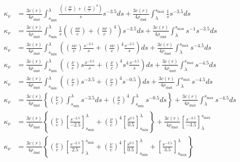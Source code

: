 \documentclass[12pt]{article}
\begin{document}
\begin{equation*}
\begin{split}
\kappa_\nu &= \frac{3c(r)}{4\rho_\mathrm{dust}} \int_{s_\mathrm{min}}^\lambda \frac{\left(\left(\frac{s\nu}{c}\right) + \left(\frac{s\nu}{c}\right)^4\right)}{s} s^{-3.5}ds + \frac{3c(r)}{4\rho_\mathrm{dust}} \int_\lambda^{s_\mathrm{max}} \frac{1}{s}s^{-3.5}ds \\
\kappa_\nu &= \frac{3c(r)}{4\rho_\mathrm{dust}} \int_{s_\mathrm{min}}^\lambda \frac{1}{s}\left(\left(\frac{s\nu}{c}\right) + \left(\frac{s\nu}{c}\right)^4\right) s^{-3.5}ds + \frac{3c(r)}{4\rho_\mathrm{dust}} \int_\lambda^{s_\mathrm{max}} s^{-1}s^{-3.5}ds \\
\kappa_\nu &= \frac{3c(r)}{4\rho_\mathrm{dust}} \int_{s_\mathrm{min}}^\lambda \left(\left(\frac{s\nu}{c}\right)\frac{s^{-3.5}}{s} + \left(\frac{s\nu}{c}\right)^4\frac{s^{-3.5}}{s}\right)ds + \frac{3c(r)}{4\rho_\mathrm{dust}} \int_\lambda^{s_\mathrm{max}} s^{-4.5}ds \\
\kappa_\nu &= \frac{3c(r)}{4\rho_\mathrm{dust}} \int_{s_\mathrm{min}}^\lambda \left(\left(\frac{\nu}{c}\right)s\frac{s^{-3.5}}{s} + \left(\frac{\nu}{c}\right)^4s^4\frac{s^{-3.5}}{s}\right)ds + \frac{3c(r)}{4\rho_\mathrm{dust}} \int_\lambda^{s_\mathrm{max}} s^{-4.5}ds \\
\kappa_\nu &= \frac{3c(r)}{4\rho_\mathrm{dust}} \int_{s_\mathrm{min}}^\lambda \left(\left(\frac{\nu}{c}\right)s^{-3.5} + \left(\frac{\nu}{c}\right)^4s^{-0.5}\right)ds + \frac{3c(r)}{4\rho_\mathrm{dust}} \int_\lambda^{s_\mathrm{max}} s^{-4.5}ds \\
\kappa_\nu &= \frac{3c(r)}{4\rho_\mathrm{dust}} \left\{\left(\frac{\nu}{c}\right)\int_{s_\mathrm{min}}^\lambda s^{-3.5}ds + \left(\frac{\nu}{c}\right)^4 \int_{s_\mathrm{min}}^\lambda s^{-0.5}ds\right\} + \frac{3c(r)}{4\rho_\mathrm{dust}} \int_\lambda^{s_\mathrm{max}} s^{-4.5}ds \\
\kappa_\nu &= \frac{3c(r)}{4\rho_\mathrm{dust}} \left\{\left(\frac{\nu}{c}\right) \left[\frac{s^{-2.5}}{-2.5}\right]_{s_\mathrm{min}}^\lambda + \left(\frac{\nu}{c}\right)^4 \left[\frac{s^{0.5}}{0.5}\right]_{s_\mathrm{min}}^\lambda \right\} + \frac{3c(r)}{4\rho_\mathrm{dust}} \left[\frac{s^{-3.5}}{-3.5}\right]_\lambda^{s_\mathrm{max}} \\
\kappa_\nu &= \frac{3c(r)}{4\rho_\mathrm{dust}} \left\{\left(\frac{\nu}{c}\right) \left[\frac{s^{-2.5}}{2.5}\right]^{s_\mathrm{min}}_\lambda + \left(\frac{\nu}{c}\right)^4 \left[\frac{s^{0.5}}{0.5}\right]_{s_\mathrm{min}}^\lambda + \left[\frac{s^{-3.5}}{3.5}\right]^\lambda_{s_\mathrm{max}} \right\} \\

\end{split}
\end{equation*}
\end{document}
